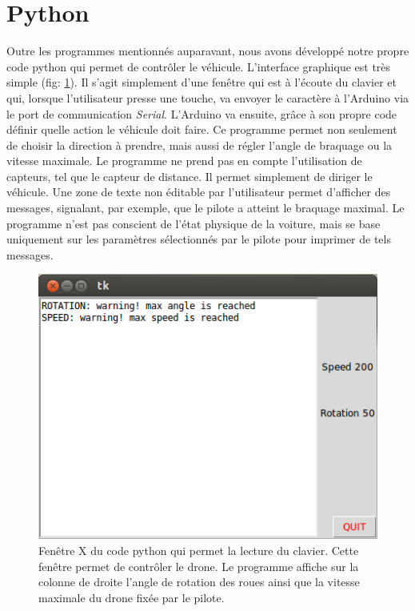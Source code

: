 \documentclass[a4paper,11pt]{report}
\begin{document}
{\section{Python}
Outre les programmes mentionnés auparavant, nous avons développé notre propre
code python qui permet de contrôler le
véhicule. L'interface graphique est très simple
(fig: \ref{pythonenvironnement}). Il s'agit simplement d'une fenêtre qui est à
l'écoute du clavier et qui, lorsque l'utilisateur presse une touche, va
envoyer le caractère à l'Arduino via le port de communication
\textit{Serial}. L'Arduino va ensuite, grâce à son propre code définir quelle action le
véhicule doit faire. Ce programme permet non seulement de choisir la direction
à prendre, mais aussi de régler l'angle de braquage ou la vitesse maximale. Le programme ne prend pas en
compte l'utilisation de capteurs, tel que le capteur de distance. Il permet
simplement de diriger le véhicule. Une zone de texte non éditable par
l'utilisateur permet d'afficher des messages, signalant, par exemple, que le
pilote a atteint le braquage maximal. Le programme n'est pas conscient de
l'état physique de la voiture, mais se base uniquement sur les paramètres
sélectionnés par le pilote pour imprimer de tels messages. 

\begin{center}
\begin{figure}[!h]
\includegraphics[scale=0.7]{Python_GUI_screen_example.png}
\caption[Interface graphique Python]{Fenêtre X du code python qui permet la lecture du clavier. Cette fenêtre permet de contrôler le drone. Le programme affiche sur la colonne de droite l'angle de rotation des roues ainsi que la vitesse maximale du drone fixée par le pilote.\label{pythonenvironnement}}
\end{figure}
\end{center}


}
\end{document}
